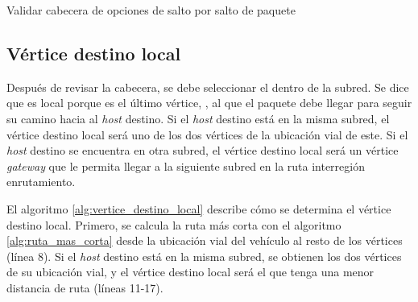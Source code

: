 \begin{algorithm}[th!]
\small
\caption{Validar cabecera de opciones de salto por salto de paquete}
\label{alg:validar_cabeceras_paquete}
\DontPrintSemicolon
\LinesNumbered
\end{algorithm}

\subsection{Vértice destino local}

\label{subsec:vertice_destino_local}

Después de revisar la cabecera, se debe seleccionar el  dentro de la subred. Se dice que es local porque es el último vértice,
, al que el paquete debe llegar para
seguir su camino hacia al \textit{host} destino. Si el \textit{host} destino
está en la misma subred, el vértice destino local será uno de los dos vértices
de la ubicación vial de este. Si el \textit{host} destino se encuentra en otra
subred, el vértice destino local será un vértice \textit{gateway} que le
permita llegar a la siguiente subred en la ruta interregión enrutamiento.

El algoritmo \ref{alg:vertice_destino_local} describe cómo se determina el
vértice destino local. Primero, se calcula la ruta más corta con el algoritmo
\ref{alg:ruta_mas_corta} desde la ubicación vial del vehículo al resto de los
vértices (línea 8). Si el \textit{host} destino está en la misma subred, se
obtienen los dos vértices de su ubicación vial, y el vértice destino local será
el que tenga una menor distancia de ruta (líneas 11-17).

